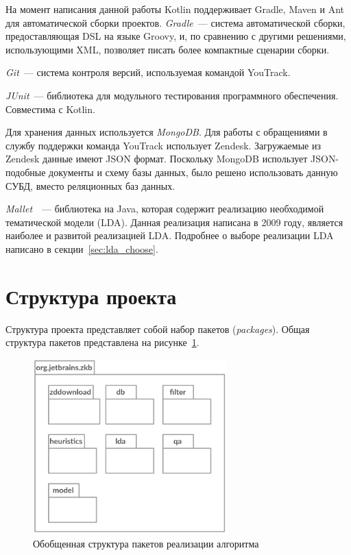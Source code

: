 На момент написания данной работы Kotlin поддерживает Gradle, Maven и Ant для автоматической сборки проектов. \textit{Gradle}~--- система автоматической сборки, предоставляющая DSL на языке Groovy, и, по сравнению с другими решениями, использующими XML, позволяет писать более компактные сценарии сборки.


\textit{Git}~--- система контроля версий, используемая командой YouTrack.

\textit{JUnit}~--- библиотека для модульного тестирования программного обеспечения. Совместима с Kotlin.

Для хранения данных используется \textit{MongoDB}. Для работы с обращениями в службу поддержки команда YouTrack использует Zendesk. Загружаемые из Zendesk данные имеют JSON формат. Поскольку MongoDB использует JSON-подобные документы и схему базы данных, было решено использовать данную СУБД, вместо реляционных баз данных.

\textit{Mallet}~\cite{MALLET}~--- библиотека на Java, которая содержит реализацию необходимой тематической модели (LDA). Данная реализация написана в 2009 году, является наиболее  и развитой реализацией LDA. Подробнее о выборе реализации LDA написано в секции~\ref{sec:lda_choose}.

\section{Структура проекта}

Структура проекта представляет собой набор пакетов (\textit{packages}). Общая структура пакетов представлена на рисунке~\ref{fig:pckgs}. 

\begin{figure}[tph!]
\centerline{\includegraphics[width=7.5cm]{fig/pckgs.png}}
    \caption{Обобщенная структура пакетов реализации алгоритма}
    \label{fig:pckgs}
\end{figure}

